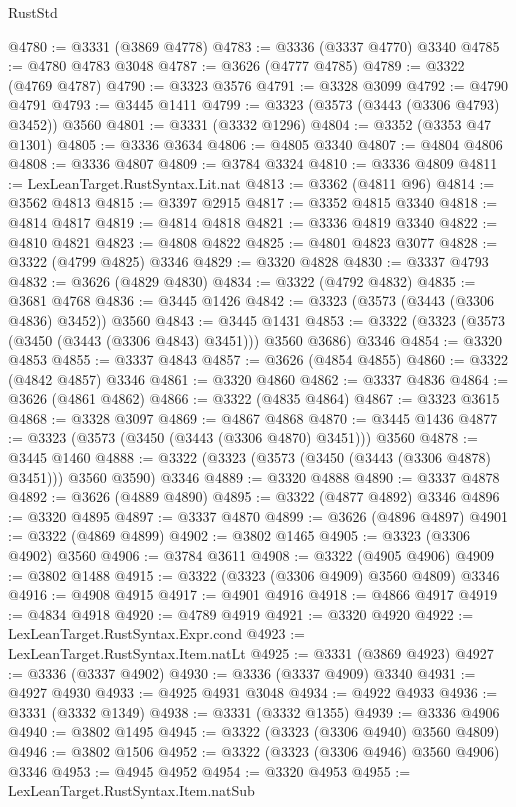 \begin{lexlean}{RustStd}
\begin{coremodule}
@4780 := @3331 (@3869 @4778)
@4783 := @3336 (@3337 @4770) @3340
@4785 := @4780 @4783 @3048
@4787 := @3626 (@4777 @4785)
@4789 := @3322 (@4769 @4787)
@4790 := @3323 @3576
@4791 := @3328 @3099
@4792 := @4790 @4791
@4793 := @3445 @1411
@4799 := @3323 (@3573 (@3443 (@3306 @4793) @3452)) @3560
@4801 := @3331 (@3332 @1296)
@4804 := @3352 (@3353 @47 @1301)
@4805 := @3336 @3634
@4806 := @4805 @3340
@4807 := @4804 @4806
@4808 := @3336 @4807
@4809 := @3784 @3324
@4810 := @3336 @4809
@4811 := LexLeanTarget.RustSyntax.Lit.nat
@4813 := @3362 (@4811 @96)
@4814 := @3562 @4813
@4815 := @3397 @2915
@4817 := @3352 @4815 @3340
@4818 := @4814 @4817
@4819 := @4814 @4818
@4821 := @3336 @4819 @3340
@4822 := @4810 @4821
@4823 := @4808 @4822
@4825 := @4801 @4823 @3077
@4828 := @3322 (@4799 @4825) @3346
@4829 := @3320 @4828
@4830 := @3337 @4793
@4832 := @3626 (@4829 @4830)
@4834 := @3322 (@4792 @4832)
@4835 := @3681 @4768
@4836 := @3445 @1426
@4842 := @3323 (@3573 (@3443 (@3306 @4836) @3452)) @3560
@4843 := @3445 @1431
@4853 := @3322 (@3323 (@3573 (@3450 (@3443 (@3306 @4843) @3451))) @3560 @3686) @3346
@4854 := @3320 @4853
@4855 := @3337 @4843
@4857 := @3626 (@4854 @4855)
@4860 := @3322 (@4842 @4857) @3346
@4861 := @3320 @4860
@4862 := @3337 @4836
@4864 := @3626 (@4861 @4862)
@4866 := @3322 (@4835 @4864)
@4867 := @3323 @3615
@4868 := @3328 @3097
@4869 := @4867 @4868
@4870 := @3445 @1436
@4877 := @3323 (@3573 (@3450 (@3443 (@3306 @4870) @3451))) @3560
@4878 := @3445 @1460
@4888 := @3322 (@3323 (@3573 (@3450 (@3443 (@3306 @4878) @3451))) @3560 @3590) @3346
@4889 := @3320 @4888
@4890 := @3337 @4878
@4892 := @3626 (@4889 @4890)
@4895 := @3322 (@4877 @4892) @3346
@4896 := @3320 @4895
@4897 := @3337 @4870
@4899 := @3626 (@4896 @4897)
@4901 := @3322 (@4869 @4899)
@4902 := @3802 @1465
@4905 := @3323 (@3306 @4902) @3560
@4906 := @3784 @3611
@4908 := @3322 (@4905 @4906)
@4909 := @3802 @1488
@4915 := @3322 (@3323 (@3306 @4909) @3560 @4809) @3346
@4916 := @4908 @4915
@4917 := @4901 @4916
@4918 := @4866 @4917
@4919 := @4834 @4918
@4920 := @4789 @4919
@4921 := @3320 @4920
@4922 := LexLeanTarget.RustSyntax.Expr.cond
@4923 := LexLeanTarget.RustSyntax.Item.natLt
@4925 := @3331 (@3869 @4923)
@4927 := @3336 (@3337 @4902)
@4930 := @3336 (@3337 @4909) @3340
@4931 := @4927 @4930
@4933 := @4925 @4931 @3048
@4934 := @4922 @4933
@4936 := @3331 (@3332 @1349)
@4938 := @3331 (@3332 @1355)
@4939 := @3336 @4906
@4940 := @3802 @1495
@4945 := @3322 (@3323 (@3306 @4940) @3560 @4809)
@4946 := @3802 @1506
@4952 := @3322 (@3323 (@3306 @4946) @3560 @4906) @3346
@4953 := @4945 @4952
@4954 := @3320 @4953
@4955 := LexLeanTarget.RustSyntax.Item.natSub

\end{coremodule}
\end{lexlean}
